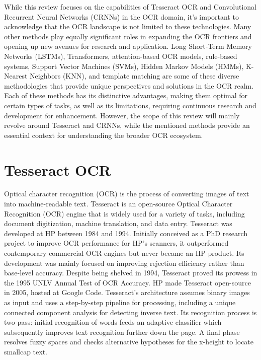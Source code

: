 While this review focuses on the capabilities of Tesseract OCR and Convolutional Recurrent Neural Networks (CRNNs) in the OCR domain, it's important to acknowledge that the OCR landscape is not limited to these technologies. Many other methods play equally significant roles in expanding the OCR frontiers and opening up new avenues for research and application. Long Short-Term Memory Networks (LSTMs), Transformers, attention-based OCR models, rule-based systems, Support Vector Machines (SVMs), Hidden Markov Models (HMMs), K-Nearest Neighbors (KNN), and template matching are some of these diverse methodologies that provide unique perspectives and solutions in the OCR realm. Each of these methods has its distinctive advantages, making them optimal for certain types of tasks, as well as its limitations, requiring continuous research and development for enhancement. However, the scope of this review will mainly revolve around Tesseract and CRNNs, while the mentioned methods provide an essential context for understanding the broader OCR ecosystem.

\newpage

\section{Tesseract OCR}

Optical character recognition (OCR) is the process of converting images of text into machine-readable text. Tesseract is an open-source Optical Character Recognition (OCR) engine that is widely used for a variety of tasks, including document digitization, machine translation, and data entry. Tesseract was developed at HP between 1984 and 1994. Initially conceived as a PhD research project to improve OCR performance for HP's scanners, it outperformed contemporary commercial OCR engines but never became an HP product. Its development was mainly focused on improving rejection efficiency rather than base-level accuracy. Despite being shelved in 1994, Tesseract proved its prowess in the 1995 UNLV Annual Test of OCR Accuracy. HP made Tesseract open-source in 2005, hosted at Google Code. Tesseract's architecture assumes binary images as input and uses a step-by-step pipeline for processing, including a unique connected component analysis for detecting inverse text. Its recognition process is two-pass: initial recognition of words feeds an adaptive classifier which subsequently improves text recognition further down the page. A final phase resolves fuzzy spaces and checks alternative hypotheses for the x-height to locate smallcap text. \cite{smithOverviewTesseractOCR2007}


